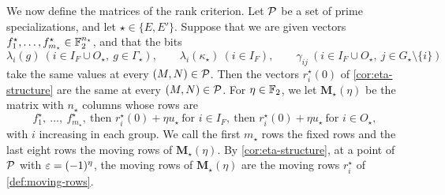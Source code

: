 We now define the matrices of the rank criterion. Let $\mathcal P$ be a set of prime specializations, and let $\star\in\{E,E'\}$. Suppose that we are given vectors $f^\star_1,\dots,f^\star_{m_\star}\in\mathbb F_2^{n_\star}$, and that the bits
\begin{equation}\label{eq:constant-bits}
\lambda_i(g)\ (i\in I_F\cup O_\star,\ g\in\Gamma_\star),\qquad\lambda_i(\kappa_\star)\ (i\in I_F),\qquad\gamma_{ij}\ (i\in I_F\cup O_\star,\ j\in G_\star\setminus\{i\})
\end{equation}
take the same values at every $(M,N)\in\mathcal P$. Then the vectors $r^\star_i(0)$ of \cref{cor:eta-structure} are the same at every $(M,N)\in\mathcal P$. For $\eta\in\mathbb F_2$, we let $\mathbf M_\star(\eta)$ be the matrix with $n_\star$ columns whose rows are
\begin{equation}\label{eq:matrix-def}
f^\star_1,\ \dots,\ f^\star_{m_\star},\ \text{then }r^\star_i(0)+\eta u_\star\ \text{for }i\in I_F,\ \text{then }r^\star_i(0)+\eta u_\star\ \text{for }i\in O_\star,
\end{equation}
with $i$ increasing in each group. We call the first $m_\star$ rows the fixed rows and the last eight rows the moving rows of $\mathbf M_\star(\eta)$. By \cref{cor:eta-structure}, at a point of $\mathcal P$ with $\varepsilon=(-1)^\eta$, the moving rows of $\mathbf M_\star(\eta)$ are the moving rows $r^\star_i$ of \cref{def:moving-rows}.

